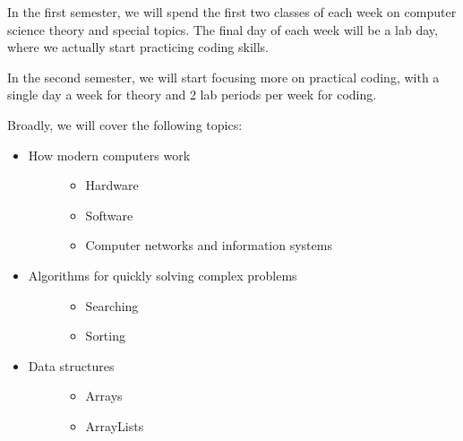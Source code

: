 \documentclass[letterpaper,10pt,english,openany,oneside]{sphinxmanual}
\begin{document}
In the first semester, we will spend the first two classes of each week on computer science theory and special topics. The final day of each week will be a lab day, where we actually start practicing coding skills.

In the second semester, we will start focusing more on practical coding, with a single day a week for theory and 2 lab periods per week for coding.

Broadly, we will cover the following topics:
\begin{itemize}
\item {} \begin{description}
\item[{How modern computers work}] \leavevmode\begin{itemize}
\item {} 
Hardware

\item {} 
Software

\item {} 
Computer networks and information systems

\end{itemize}

\end{description}

\item {} \begin{description}
\item[{Algorithms for quickly solving complex problems}] \leavevmode\begin{itemize}
\item {} 
Searching

\item {} 
Sorting

\end{itemize}

\end{description}

\item {} \begin{description}
\item[{Data structures}] \leavevmode\begin{itemize}
\item {} 
Arrays

\item {} 
ArrayLists

\end{itemize}

\end{description}


\end{itemize}
\end{document}
